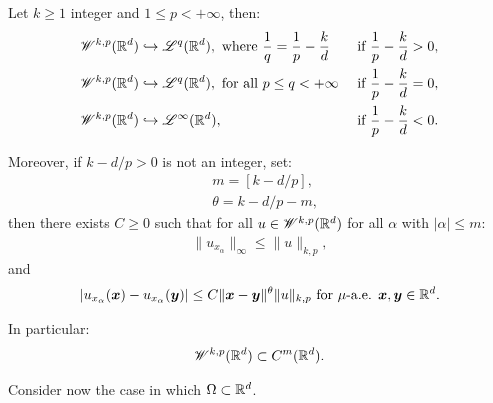\begin{corollary} \label{corollary:embedding}
    Let $k \geq 1$ integer and $1 \leq p < +\infty$, then:
    \begin{align}
        & \mathscr{W}^{k, p}(\mathbb{R}^{d}) \hookrightarrow \mathscr{L}^{q}(\mathbb{R}^{d}), \text{ where } \frac{1}{q} = \frac{1}{p} - \frac{k}{d} & \text{ if } \frac{1}{p} - \frac{k}{d} > 0, \\
        & \mathscr{W}^{k, p}(\mathbb{R}^{d}) \hookrightarrow \mathscr{L}^{q}(\mathbb{R}^{d}), \text{ for all } p \leq q < +\infty & \text{ if } \frac{1}{p} - \frac{k}{d} = 0, \\
        & \mathscr{W}^{k, p}(\mathbb{R}^{d}) \hookrightarrow \mathscr{L}^{\infty}(\mathbb{R}^{d}), & \text{ if } \frac{1}{p} - \frac{k}{d} < 0.
    \end{align}

    Moreover, if $k - d/p > 0$ is not an integer, set:
    \begin{align}
        & m = \left[ k - d/p \right], \\
        & \theta = k - d/p - m,
    \end{align}
    then there exists $C \geq 0$ such that for all $u \in \mathscr{W}^{k, p}(\mathbb{R}^{d})$ for all $\alpha$ with $\lvert \alpha \rvert \leq m$:
    \begin{gather}
        \lVert u_{x_{\alpha}} \rVert_{\infty} \leq \lVert u \rVert_{k, p},
    \end{gather}
    and
    \begin{gather}
        \lvert u_{x_{\alpha}}(\bm{x}) - u_{x_{\alpha}}(\bm{y}) \rvert \leq C \lVert \bm{x} - \bm{y} \rVert^{\theta} \lVert u \rVert_{k, p} \text{ for } \mu \text{-a.e. } \bm{x}, \bm{y} \in \mathbb{R}^{d}.
    \end{gather}

    In particular:
    \begin{gather}
        \mathscr{W}^{k, p}(\mathbb{R}^{d}) \subset C^m(\mathbb{R}^{d}).
    \end{gather}
\end{corollary}

Consider now the case in which $\Omega \subset \mathbb{R}^{d}$.

